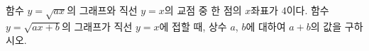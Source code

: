 \hspace*{2mm}\begin{minipage}[t]{\dimexpr\linewidth-2mm\relax}\vspace{0pt}
함수 $y=\sqrt{ax}$의 그래프와 직선 $y=x$의 교점 중 한 점의 $x$좌표가 $4$이다. 함수 $y=\sqrt{ax+b}$의 그래프가 직선 $y=x$에 접할 때, 상수 $a$, $b$에 대하여 $a+b$의 값을 구하시오.\end{minipage}
